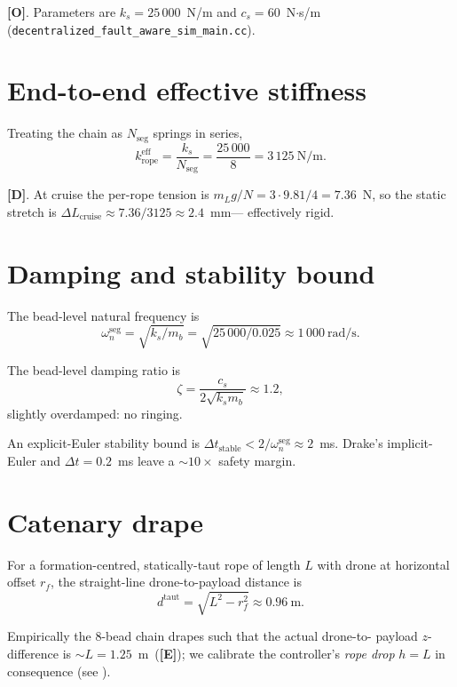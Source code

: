 \documentclass[11pt,a4paper,oneside]{report}
\newcommand{\rope}{\text{rope}}
\newcommand{\Obs}{\textcolor{green!50!black}{\textbf{[O]}}}
\newcommand{\Der}{\textcolor{blue!60!black}{\textbf{[D]}}}
\newcommand{\Emp}{\textcolor{purple!60!black}{\textbf{[E]}}}
\begin{document}
\Obs. Parameters are $k_s=25\,000$~N/m and $c_s=60$~N$\cdot$s/m
(\texttt{decentralized\_fault\_aware\_sim\_main.cc}).

\section{End-to-end effective stiffness}

Treating the chain as $N_{\text{seg}}$ springs in series,
\begin{equation}
k_{\rope}^{\text{eff}} = \frac{k_s}{N_{\text{seg}}}
= \frac{25\,000}{8} = 3\,125~\text{N/m}.
\label{eq:keff}
\end{equation}

\Der. At cruise the per-rope tension is
$m_L g/N = 3\cdot 9.81/4 = 7.36$~N, so the static stretch is
$\Delta L_\text{cruise}\approx 7.36/3125 \approx 2.4$~mm---
effectively rigid.

\section{Damping and stability bound}

The bead-level natural frequency is
\begin{equation}
\omega_n^{\text{seg}} = \sqrt{k_s/m_b} = \sqrt{25\,000/0.025}
\approx 1\,000~\text{rad/s}. \label{eq:omega-seg}
\end{equation}

The bead-level damping ratio is
\begin{equation}
\zeta = \frac{c_s}{2\sqrt{k_s m_b}} \approx 1.2,
\end{equation}
slightly overdamped: no ringing.

An explicit-Euler stability bound is
$\Delta t_\text{stable} < 2/\omega_n^{\text{seg}} \approx 2$~ms.
Drake's implicit-Euler and $\Delta t = 0.2$~ms leave a $\sim 10\times$
safety margin.

\section{Catenary drape}

For a formation-centred, statically-taut rope of length $L$ with
drone at horizontal offset $r_f$, the straight-line drone-to-payload
distance is
\begin{equation}
d^{\text{taut}} = \sqrt{L^2 - r_f^2} \approx 0.96~\text{m}.
\end{equation}

Empirically the 8-bead chain drapes such that the actual drone-to-
payload $z$-difference is $\sim L = 1.25$~m~(\Emp); we calibrate the
controller's \emph{rope drop} $h = L$ in consequence (see
).
\end{document}
